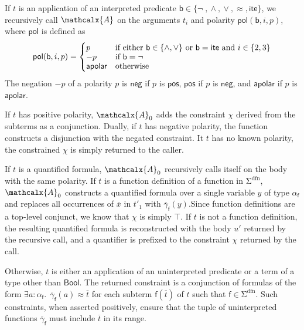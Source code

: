 \documentclass[runningheads,a4paper]{llncs}
\newcommand\pnegate{-}
\newcommand{\con}[1]{\mathsf{#1}}
\renewcommand\vec[1]{\overline{#1}}
\let\oldSigma=\Sigma
\def\Sigma{\mathrm{\oldSigma}}
\let\oldneg=\neg
\def\neg{\oldneg\;}
\let\oldvee=\vee
\def\vee{\mathrel{\oldvee}}
\let\oldwedge=\wedge
\def\wedge{\mathrel{\oldwedge}}
\newcommand{\teq}{\approx}
\newcommand{\conv}{\mathcalx{A}}
\newcommand{\sfundefs}[1]{#1^\mathrm{dfn}}
\newcommand{\pnone}{\con{apolar}}
\newcommand{\ppos}{\con{pos}}
\newcommand{\pneg}{\con{neg}}
\newcommand{\pol}{\con{pol}}
\newcommand\ty[1]{\con{#1}}
\newcommand{\Bool}{\ty{Bool}}
\newcommand{\ltrue}{\top}
\newcommand{\lite}{\con{ite}}
\newcommand\concret{\gamma} %
\newcommand{\boolop}{\con{b}}
\newcommand{\vecfarg}[1]{\vec{\concret}_{#1}}
\newcommand{\fargsort}[1]{\alpha_{#1}}
\begin{document}
If $t$ is an application of an interpreted predicate $\boolop
\in \{{\neg}, {\wedge}, {\vee}, {\teq}, {\lite}\}$,
we recursively call $\conv$ on the arguments $t_i$ and polarity $\pol( \boolop,
i, p )$, where $\pol$ is defined as
\begin{equation*}
\pol( \boolop, i, p ) =
\begin{cases}
p & \text{if either $\boolop \in \{{\wedge}, {\vee}\}$ or $\boolop = \lite$ and $i \in \{2, 3\}$} \\[-\jot]
\pnegate p & \text{if $\boolop = {\neg}$} \\[-\jot]
\pnone & \text{otherwise}
\end{cases}
\end{equation*}
The negation $\pnegate p$ of a polarity $p$ is $\pneg$ if $p$ is $\ppos$, $\ppos$
if $p$ is $\pneg$, and $\pnone$ if $p$ is $\pnone$.

If $t$ has positive polarity, $\conv_0$ adds the constraint $\chi$ derived from
the subterms as a conjunction. Dually, if $t$ has negative polarity, the
function constructs a disjunction with the negated constraint. It $t$ has no
known polarity, the constrained $\chi$ is simply returned to the caller.

If $t$ is a quantified formula, $\conv_0$ recursively calls itself on the body
with the same polarity. If $t$ is a function definition of a function in
$\sfundefs{\Sigma}$, $\conv_0$ constructs a quantified formula over a single variable
$y$ of type $\fargsort{\con{f}}$ and replaces all occurrences of $\vec x$ in
$t'_1$ with $\vecfarg{\con{f}}( y )$.Since function definitions
are a top-level conjunct, %
we know that $\chi$ is simply $\ltrue$.
If $t$ is not a function definition, the resulting
quantified formula is reconstructed with the body $u'$ returned by the
recursive call, and a quantifier is prefixed to the constraint $\chi$
returned by the call.

Otherwise, $t$ is either an application of an uninterpreted predicate or a term
of a type other than $\Bool$. The returned constraint is a conjunction of
formulas of the form $\exists a : {\fargsort{\con{f}}}.\;\, \vecfarg{\con{f}}(
a ) \teq \vec t$ for each subterm $\con{f}( \vec t )$ of $t$ such that $\con{f}
\in \sfundefs{\Sigma}$. Such constraints, when asserted positively, ensure that
the tuple of uninterpreted functions $\vecfarg{\con{f}}$ must include $\vec t$
in its range.

\end{document}
